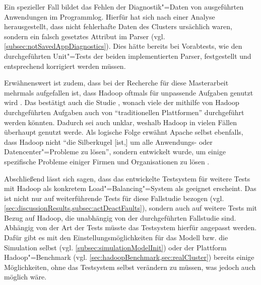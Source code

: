 Ein spezieller Fall bildet das Fehlen der Diagnostik"=Daten von ausgeführten Anwendungen im Programmlog.
Hierfür hat sich nach einer Analyse herausgestellt, dass nicht fehlerhafte Daten des Clusters ursächlich waren, sondern ein falsch gesetztes Attribut im Parser (vgl. \cref{subsec:notSavedAppDiagnostics}).
Dies hätte bereits bei Vorabtests, wie den durchgeführten Unit"=Tests der beiden implementierten Parser, festgestellt und entsprechend korrigiert werden müssen.

Erwähnenswert ist zudem, dass bei der Recherche für diese Masterarbeit mehrmals aufgefallen ist, dass Hadoop oftmals für unpassende Aufgaben genutzt wird \cite{Ren2013,Vavilapalli2013}.
Das bestätigt auch die Studie \cite{HadoopDataTypes}, wonach viele der mithilfe von Hadoop durchgeführten Aufgaben auch von \enquote{traditionellen Plattformen} durchgeführt werden könnten.
Dadurch sei auch unklar, weshalb Hadoop in vielen Fällen überhaupt genutzt werde.
Als logische Folge erwähnt Apache selbst ebenfalls, dass Hadoop nicht \enquote{die Silberkugel [ist,] um alle Anwendungs- oder Datencenter"=Probleme zu lösen}, sondern entwickelt wurde, um einige spezifische Probleme einiger Firmen und Organisationen zu lösen \cite{HadoopIsNot}.

Abschließend lässt sich sagen, dass das entwickelte Testsystem für weitere Tests mit Hadoop als konkretem Load"=Balancing"=System als geeignet erscheint.
Das ist nicht nur auf weiterführende Tests für diese Fallstudie bezogen (vgl. \cref{sec:discussionResults,subsec:actDeactFaults}), sondern auch auf weitere Tests mit Bezug auf Hadoop, die unabhängig von der durchgeführten Fallstudie sind.
Abhängig von der Art der Tests müsste das Testsystem  hierfür angepasst werden.
Dafür gibt es mit den Einstellungsmöglichkeiten für das Modell bzw. die Simulation selbst (vgl. \cref{subsec:simulationModelInit}) oder der Plattform Hadoop"=Benchmark (vgl. \cref{sec:hadoopBenchmark,sec:realCluster}) bereits einige Möglichkeiten, ohne das Testsystem selbst verändern zu müssen, was jedoch auch möglich wäre.

